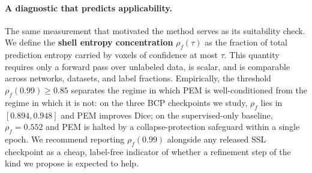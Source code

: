 \paragraph{A diagnostic that predicts applicability.}
The same measurement that motivated the method serves as its suitability check. We define the \textbf{shell entropy concentration} $\rho_f(\tau)$ as the fraction of total prediction entropy carried by voxels of confidence at most $\tau$. This quantity requires only a forward pass over unlabeled data, is scalar, and is comparable across networks, datasets, and label fractions. Empirically, the threshold $\rho_f(0.99)\!\ge\!0.85$ separates the regime in which PEM is well-conditioned from the regime in which it is not: on the three BCP checkpoints we study, $\rho_f$ lies in $[0.894, 0.948]$ and PEM improves Dice; on the supervised-only baseline, $\rho_f\!=\!0.552$ and PEM is halted by a collapse-protection safeguard within a single epoch. We recommend reporting $\rho_f(0.99)$ alongside any released SSL checkpoint as a cheap, label-free indicator of whether a refinement step of the kind we propose is expected to help.

